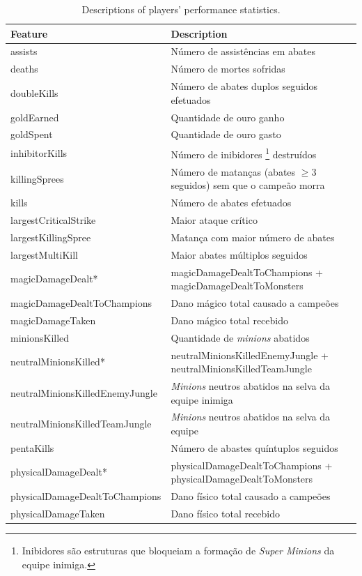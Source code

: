 \begin{table}
  \scriptsize
  \caption{Descriptions of players' performance statistics.}
  \label{tab:features-desc}
  \begin{tabular}{p{}p{}}
    \toprule
    Feature & Description \\
    \midrule
assists & Número de assistências em abates\\
deaths & Número de mortes sofridas \\
doubleKills & Número de abates duplos seguidos efetuados\\
goldEarned & Quantidade de ouro ganho\\
goldSpent & Quantidade de ouro gasto\\
inhibitorKills & Número de inibidores \footnote{Inibidores são estruturas que bloqueiam a formação de \textit{Super Minions} da equipe inimiga.} destruídos\\
killingSprees & Número de matanças (abates $\geq 3$ seguidos) sem que o campeão morra \\
kills & Número de abates efetuados\\
largestCriticalStrike & Maior ataque crítico\\
largestKillingSpree & Matança com maior número de abates\\
largestMultiKill & Maior abates múltiplos seguidos\\
magicDamageDealt* & magicDamageDealtToChampions +  magicDamageDealtToMonsters\\
magicDamageDealtToChampions & Dano mágico total causado a campeões\\
magicDamageTaken & Dano mágico total recebido\\
minionsKilled & Quantidade de \textit{minions} abatidos\\
 neutralMinionsKilled* & neutralMinionsKilledEnemyJungle + neutralMinionsKilledTeamJungle\\
neutralMinionsKilledEnemyJungle & \textit{Minions} neutros abatidos na selva da equipe inimiga
\\
neutralMinionsKilledTeamJungle & \textit{Minions} neutros abatidos na selva da equipe\\
pentaKills & Número de abastes quíntuplos seguidos\\
physicalDamageDealt* & physicalDamageDealtToChampions + physicalDamageDealtToMonsters\\
physicalDamageDealtToChampions & Dano físico total causado a campeões\\
physicalDamageTaken & Dano físico total recebido\\

\end{tabular}
\end{table}
